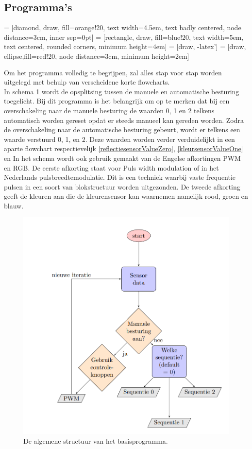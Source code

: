 \documentclass[a4paper,twoside,kulak]{kulakreport} %
\begin{document}
\subsection{Programma's}\label{definitieve programma's}
 = [diamond, draw, fill=orange!20, text width=4.5em, text badly centered, node distance=3cm, inner sep=0pt]
 = [rectangle, draw, fill=blue!20, text width=5em, text centered, rounded corners, minimum height=4em]
 = [draw, -latex']
 = [draw, ellipse,fill=red!20, node distance=3cm,
minimum height=2em]


Om het programma volledig te begrijpen, zal alles stap voor stap worden uitgelegd met behulp van verscheidene korte flowcharts. \\
In schema \ref{programmaBegin} wordt de opsplitsing tussen de manuele en automatische besturing toegelicht. Bij dit programma is het belangrijk om op te merken dat bij een overschakeling naar de manuele besturing de waarden 0, 1 en 2 telkens automatisch worden gereset opdat er steeds manueel kan gereden worden. %
Zodra de overschakeling naar de automatische besturing gebeurt, wordt er telkens een waarde verstuurd 0, 1, en 2. Deze waarden worden verder verduidelijkt in een aparte flowchart respectievelijk \ref{reflectiesensorValueZero}, \ref{kleursensorValueOne} en %
In het schema wordt ook gebruik gemaakt van de Engelse afkortingen PWM en RGB. De eerste afkorting staat voor Puls width modulation of in het Nederlands pulsbreedtemodulatie. Dit is een techniek waarbij vaste frequentie pulsen in een soort van blokstructuur worden uitgezonden.%
De tweede afkorting geeft de kleuren aan die de kleurensensor kan waarnemen namelijk rood, groen en blauw.
\\
\begin{figure}
	\centering
	\includegraphics[width=.6\textwidth]{flowchartBegin}
	\caption{De algemene structuur van het basisprogramma.}
	\label{programmaBegin}
\end{figure}
\end{document}
